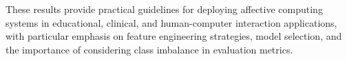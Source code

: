 These results provide practical guidelines for deploying affective computing systems in educational, clinical, and human-computer interaction applications, with particular emphasis on feature engineering strategies, model selection, and the importance of considering class imbalance in evaluation metrics.
